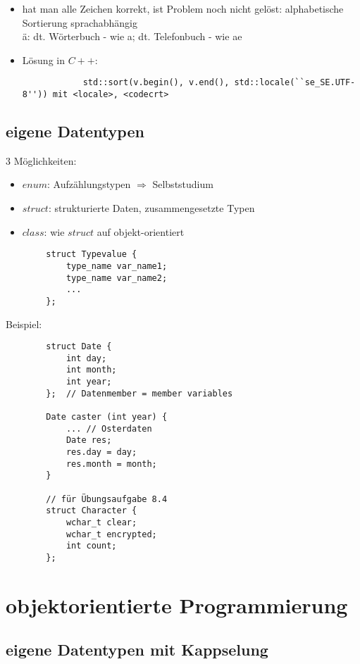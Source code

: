 \documentclass{article}
\begin{document}
	\begin{itemize}
		\item hat man alle Zeichen korrekt, ist Problem noch nicht gelöst: alphabetische Sortierung sprachabhängig \\
		ä: dt. Wörterbuch - wie a; dt. Telefonbuch - wie ae
		\item Lösung in $C++$: 
		\begin{lstlisting}
			std::sort(v.begin(), v.end(), std::locale(``se_SE.UTF-8'')) mit <locale>, <codecrt>
		\end{lstlisting}
	\end{itemize}

	\subsection{eigene Datentypen}
	$3$ Möglichkeiten:
	\begin{itemize}
		\item $enum$: Aufzählungstypen $\Rightarrow $ Selbststudium
		\item $struct$: strukturierte Daten, zusammengesetzte Typen
		\item $class$: wie $struct$ auf objekt-orientiert
	\end{itemize}

	\begin{lstlisting}
		struct Typevalue {
			type_name var_name1;
			type_name var_name2;
			...
		};
	\end{lstlisting}
	Beispiel:
	\begin{lstlisting}
		struct Date {
			int day;
			int month;
			int year;
		};  // Datenmember = member variables 

		Date caster (int year) {
			... // Osterdaten
			Date res;
			res.day = day;
			res.month = month;
		}

		// für Übungsaufgabe 8.4
		struct Character {
			wchar_t clear;
			wchar_t encrypted;
			int count;
		};
	\end{lstlisting}


\section{objektorientierte Programmierung}

\subsection{eigene Datentypen mit Kappselung}
\end{document}
